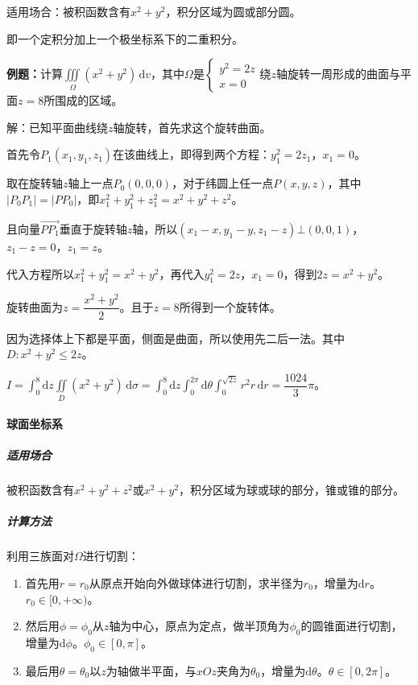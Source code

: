 \documentclass[UTF8, 12pt]{ctexart}
\begin{document}
适用场合：被积函数含有$x^2+y^2$，积分区域为圆或部分圆。

即一个定积分加上一个极坐标系下的二重积分。


\textbf{例题：}计算$\iiint\limits_\Omega(x^2+y^2)\,\textrm{d}v$，其中$\Omega$是$\left\{\begin{array}{ll}
    y^2=2z \\
    x=0
\end{array}\right.$绕$z$轴旋转一周形成的曲面与平面$z=8$所围成的区域。

解：已知平面曲线绕$z$轴旋转，首先求这个旋转曲面。

首先令$P_1(x_1,y_1,z_1)$在该曲线上，即得到两个方程：$y_1^2=2z_1$，$x_1=0$。

取在旋转轴$z$轴上一点$P_0(0,0,0)$，对于纬圆上任一点$P(x,y,z)$，其中$\vert P_0P_1\vert=\vert PP_0\vert$，即$x_1^2+y_1^2+z_1^2=x^2+y^2+z^2$。

且向量$\overrightarrow{PP_1}$垂直于旋转轴$z$轴，所以$(x_1-x,y_1-y,z_1-z)\bot(0,0,1)$，$z_1-z=0$，$z_1=z$。

代入方程所以$x_1^2+y_1^2=x^2+y^2$，再代入$y_1^2=2z$，$x_1=0$，得到$2z=x^2+y^2$。

旋转曲面为$z=\dfrac{x^2+y^2}{2}$。且于$z=8$所得到一个旋转体。

因为选择体上下都是平面，侧面是曲面，所以使用先二后一法。其中$D:x^2+y^2\leqslant2z$。

$I=\int_0^8\textrm{d}z\iint\limits_D(x^2+y^2)\,\textrm{d}\sigma=\int_0^8\textrm{d}z\int_0^{2\pi}\textrm{d}\theta\int_0^{\sqrt{2z}}r^2r\,\textrm{d}r=\dfrac{1024}{3}\pi$。

\paragraph{球面坐标系} \leavevmode \medskip

\subparagraph{适用场合} \leavevmode \medskip

被积函数含有$x^2+y^2+z^2$或$x^2+y^2$，积分区域为球或球的部分，锥或锥的部分。

\subparagraph{计算方法} \leavevmode \medskip

利用三族面对$\Omega$进行切割：

\begin{enumerate}
    \item 首先用$r=r_0$从原点开始向外做球体进行切割，求半径为$r_0$，增量为$\textrm{d}r$。$r_0\in[0,+\infty)$。
    \item 然后用$\phi=\phi_0$从$z$轴为中心，原点为定点，做半顶角为$\phi_0$的圆锥面进行切割，增量为$\textrm{d}\phi$。$\phi_0\in[0,\pi]$。
    \item 最后用$\theta=\theta_0$以$z$为轴做半平面，与$xOz$夹角为$\theta_0$，增量为$\textrm{d}\theta$。$\theta\in[0,2\pi]$。
\end{enumerate}
\end{document}
